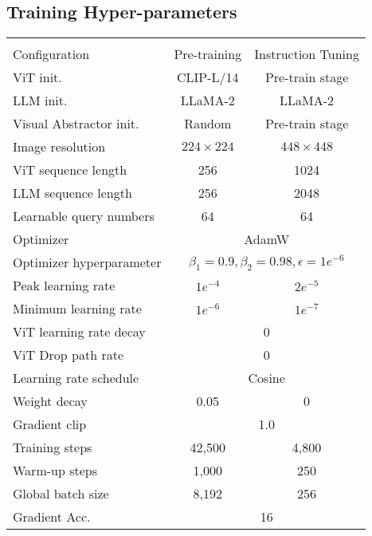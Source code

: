 \documentclass[10pt,twocolumn,letterpaper]{article}
\newlength\savewidth
\newcommand\shline{\noalign{\global\savewidth\arrayrulewidth\global\arrayrulewidth 1pt}\hline\noalign{\global\arrayrulewidth\savewidth}}
\newcommand{\tablestyle}[2]{\setlength{\tabcolsep}{#1}\renewcommand{\arraystretch}{#2}\centering\small}
\begin{document}
\subsection{Training Hyper-parameters}
\begin{table}[htbp]
    \centering
    \tablestyle{7pt}{1.0}
    \begin{tabular}{l|cc}
         \shline \\
         Configuration            & Pre-training & Instruction Tuning \\
         \hline
         ViT init.                & CLIP-L/14 \cite{radford2021clip} & Pre-train stage \\
         LLM init.                & LLaMA-2 \cite{Touvron2023Llama2} & LLaMA-2 \cite{Touvron2023Llama2} \\
         Visual Abstractor init.  & Random & Pre-train stage \\
         Image resolution         & $224\times 224$ & $448\times 448$ \\
         ViT sequence length      & 256 & 1024 \\
         LLM sequence length      & 256 & 2048\\
         Learnable query numbers  & 64 & 64\\
         Optimizer                & \multicolumn{2}{c}{AdamW} \\
         Optimizer hyperparameter & \multicolumn{2}{c}{$\beta_{1}=0.9, \beta_{2}=0.98, \epsilon=1e^{-6}$} \\
         Peak learning rate       & $1e^{-4}$ & $2e^{-5}$ \\
         Minimum learning rate    & $1e^{-6}$ & $1e^{-7}$ \\
         ViT learning rate decay  & \multicolumn{2}{c}{0} \\
         ViT Drop path rate       & \multicolumn{2}{c}{0} \\
         Learning rate schedule   & \multicolumn{2}{c}{Cosine} \\
         Weight decay             & 0.05 & 0 \\
         Gradient clip            & \multicolumn{2}{c}{1.0} \\
         Training steps           & 42,500 & 4,800 \\
         Warm-up steps            & 1,000 & 250 \\
         Global batch size        & 8,192 & 256 \\
         Gradient Acc.            & \multicolumn{2}{c}{16} \\

\end{tabular}
\end{table}
\end{document}
